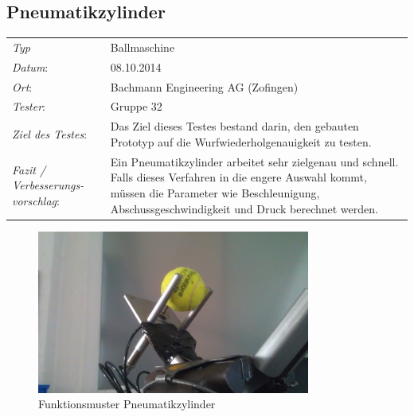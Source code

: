 \subsection{Pneumatikzylinder}

\begin{tabular}{p{3.6cm}p{9.4cm}}
\rule{0pt}{11pt}\textit{Typ}              & Ballmaschine \\ 
\rule{0pt}{11pt}\textit{Datum}:           & 08.10.2014   \\
\rule{0pt}{11pt}\textit{Ort}:             & Bachmann Engineering AG (Zofingen) \\
\rule{0pt}{11pt}\textit{Tester}:          & Gruppe 32\\
\rule{0pt}{11pt}\textit{Ziel des Testes}: & Das Ziel dieses Testes bestand darin, den gebauten Prototyp auf die Wurfwiederholgenauigkeit zu testen. \\
\rule{0pt}{11pt}\textit{Fazit / Verbesserungs-\newline vorschlag}: & Ein Pneumatikzylinder arbeitet sehr zielgenau und schnell. Falls dieses Verfahren in die engere Auswahl kommt, müssen die Parameter wie Beschleunigung, Abschussgeschwindigkeit und Druck berechnet werden.\\ 
\end{tabular}

\begin{figure}[h!]
	\includegraphics[width=0.8\textwidth]{Funktionstests/Bilder/PneumatikzylinderBild.jpg}
	\centering
	\caption{Funktionsmuster Pneumatikzylinder} 
\label{abb:PneumatikzylinderBild}
\end{figure}